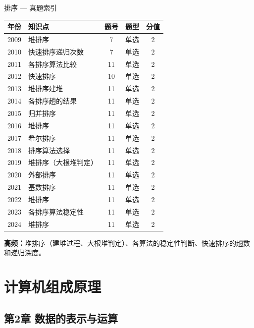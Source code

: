 \begin{tablebox}{排序 — 真题索引}
\centering
\begin{tabular}{|c|l|c|c|c|}
\hline
年份 & 知识点 & 题号 & 题型 & 分值 \\
\hline
2009 & 堆排序 & 7 & 单选 & 2 \\
2010 & 快速排序递归次数 & 7 & 单选 & 2 \\
2011 & 各排序算法比较 & 11 & 单选 & 2 \\
2012 & 快速排序 & 10 & 单选 & 2 \\
2013 & 堆排序建堆 & 11 & 单选 & 2 \\
2014 & 各排序趟的结果 & 11 & 单选 & 2 \\
2015 & 归并排序 & 11 & 单选 & 2 \\
2016 & 堆排序 & 11 & 单选 & 2 \\
2017 & 希尔排序 & 11 & 单选 & 2 \\
2018 & 排序算法选择 & 11 & 单选 & 2 \\
2019 & 堆排序（大根堆判定）& 11 & 单选 & 2 \\
2020 & 外部排序 & 11 & 单选 & 2 \\
2021 & 基数排序 & 11 & 单选 & 2 \\
2022 & 堆排序 & 11 & 单选 & 2 \\
2023 & 各排序算法稳定性 & 11 & 单选 & 2 \\
2024 & 堆排序 & 11 & 单选 & 2 \\
\hline
\end{tabular}
\end{tablebox}

\noindent\textbf{高频：}堆排序（建堆过程、大根堆判定）、各算法的稳定性判断、快速排序的趟数和递归深度。

\section{计算机组成原理}

\subsection*{第2章 数据的表示与运算}


